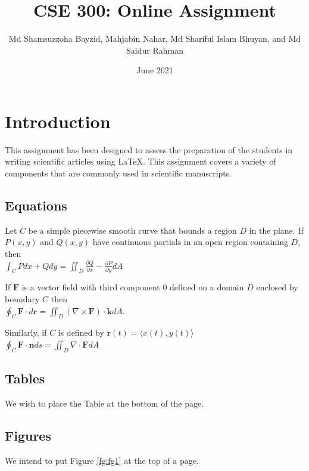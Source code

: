 \documentclass[12pt, a4paper]{article}
\title{CSE 300: Online Assignment}
\author{Md Shamsuzzoha Bayzid, Mahjabin Nahar, Md Shariful Islam Bhuyan,
	and Md Saidur Rahman}
\date{June 2021}
\begin{document}
	\maketitle
	\section{Introduction}
	This assignment has been designed to assess the preparation of the students
	in writing scientific articles using \LaTeX. This assignment covers a variety of
	components that are commonly used in scientific manuscripts.
	\subsection{Equations}
	Let $C$ be a simple piecewise smooth curve that bounds a region $D$ in the
	plane. If $P\left(x,y\right)$ and $Q\left(x,y\right)$ have continuous partials in an open region
	containing $D$, then\\
	$ \int_{C}Pdx + Qdy = \iint_{D} \frac{\partial Q}{\partial x} -\frac{\partial P}{\partial y} dA  $
	\par
	If $\mathrm{\textbf{F}}$ is a vector field with third component 0 defined on a domain $D$
	enclosed by boundary $C$ then\\
	$ \oint_{C} \mathrm{\textbf{F}}\cdot d\mathrm{\textbf{r}} = \iint_{D} \left(\nabla \times \mathrm{\textbf{F}} \right) \cdot \mathrm{\textbf{k}}dA. $
	\par
	Similarly, if $C$ is defined by $\mathrm{\textbf{r}}(t) = \langle
	x(t), y(t)\rangle	$\\
	$ \oint_{C} \mathrm{\textbf{F}}\cdot \mathrm{\textbf{n}} ds = \iint_{D} \nabla \cdot \mathrm{\textbf{F}} dA $
	
	\subsection{Tables}
	We wish to place the Table at the bottom of the page.
	\subsection{Figures}
	We intend to put Figure \ref{fg:fg1} at the top of a page.
	
\end{document}
